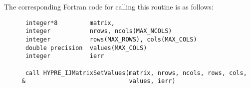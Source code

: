 The corresponding Fortran code for calling this routine is as follows:
\begin{display}
\begin{verbatim}
      integer*8         matrix, 
      integer           nrows, ncols(MAX_NCOLS)
      integer           rows(MAX_ROWS), cols(MAX_COLS)
      double precision  values(MAX_COLS)
      integer           ierr

      call HYPRE_IJMatrixSetValues(matrix, nrows, ncols, rows, cols,
     &                             values, ierr)
\end{verbatim}
\end{display}

%
%
%
%
%

